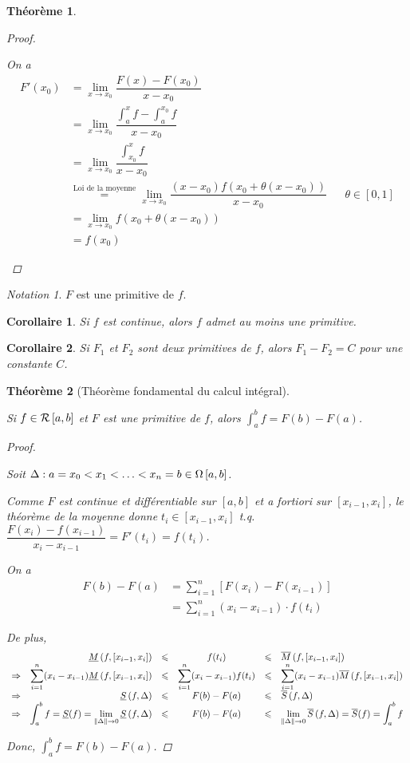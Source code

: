 \documentclass{report}
\newcommand*{\Ssup}[1]{\overline{S}(#1)}
\newcommand*{\Sinf}[1]{\underline{S}(#1)}
\newcommand*{\dsum}[4]{\displaystyle\sum_{#1=#2}^{#3}#4}
\newcommand*{\dlim}[3]{\displaystyle\lim_{#1 \to #2}#3}
\newcommand*{\dint}[3]{\displaystyle\int_{#1}^{#2}#3}
\newcommand*{\norme}[1]{\left\| #1 \right\|}
\newcommand*{\lte}{\leqslant}
\newtheorem*{thm}{Th\'eor\`eme}
\newtheorem*{coro}{Corollaire}
\theoremstyle{definition}
\theoremstyle{remark}
\newtheorem*{nota}{Notation}
\begin{document}
\begin{thm}
\begin{proof}
\begin{enumerate}[label=\alph*)]
				On a
				\begin{align*}
					F'(x_0)&= \dlim{x}{x_0}{\dfrac{F(x)-F(x_0)}{x-x_0}}\\
					&= \dlim{x}{x_0}{\dfrac{\dint{a}{x}{f} - \dint{a}{x_0}{f}}{x-x_0}}\\
					&= \dlim{x}{x_0}{\dfrac{\dint{x_0}{x}{f}}{x-x_0}}\\
					&\overset{\text{Loi de la moyenne}}{=} \dlim{x}{x_0}{\dfrac{(x-x_0)f(x_0+\theta(x-x_0))}{x-x_0}}&&\theta \in [0,1]\\
					&= \dlim{x}{x_0}{f(x_0+\theta(x-x_0))}\\
					&= f(x_0)
				\end{align*}
			\end{enumerate}
		\end{proof}
	\end{thm}
	\begin{nota}
		$F$ est une primitive de $f$.
	\end{nota}
	\begin{coro}
		Si $f$ est continue, alors $f$ admet au moins une primitive.
	\end{coro}
	\begin{coro}
		Si $F_1$ et $F_2$ sont deux primitives de $f$, alors $F_1-F_2=C$ pour une constante $C$.
	\end{coro}
	\begin{thm}[Th\'eor\`eme fondamental du calcul int\'egral]~

		Si $f \in \riemann$ et $F$ est une primitive de $f$, alors $\dint{a}{b}{f}=F(b)-F(a)$.
		\begin{proof}~

			Soit $\Delta:a=x_0<x_1<\dotsc<x_n=b \in \partitions$.

			Comme $F$ est continue et diff\'erentiable sur $[a,b]$ et a fortiori sur $[x_{i-1},x_i]$, le th\'eor\`eme de la moyenne donne $t_i \in [x_{i-1},x_i]$ t.q. $\dfrac{F(x_i) - f(x_{i-1})}{x_i-x_{i-1}} = F'(t_i) = f(t_i)$.

			On a
			\begin{align*}
				F(b)-F(a)&= \dsum{i}{1}{n}{\left[ F(x_i)-F(x_{i-1}) \right]}\\
				&= \dsum{i}{1}{n}{(x_i-x_{i-1}) \cdot f(t_i)}
			\end{align*}

			De plus,
			\[
			\begin{array}{rrcccl}
				&\minf{f}[x_{i-1},x_i] &\lte& f(t_i) &\lte& \msup{f}[x_{i-1},x_i]\\
				\Rightarrow&\dsum{i}{1}{n}{(x_i-x_{i-1})\minf{f}[x_{i-1},x_i]} &\lte& \dsum{i}{1}{n}{(x_i-x_{i-1})f(t_i)} &\lte& \dsum{i}{1}{n}{(x_i-x_{i-1})\msup{f}[x_{i-1},x_i]}\\
				\Rightarrow&\sinf{f} &\lte& F(b)-F(a) &\lte& \ssup{f}\\
				\Rightarrow&\dint{a}{b}{f}=\Sinf{f}=\dlim{\norme{\Delta}}{0}{\sinf{f}} &\lte& F(b)-F(a) &\lte& \dlim{\norme{\Delta}}{0}{\ssup{f}}=\Ssup{f}=\dint{a}{b}{f}
			\end{array}
			\]

			Donc, $\dint{a}{b}{f}=F(b)-F(a)$.
		\end{proof}
	\end{thm}
\end{document}

